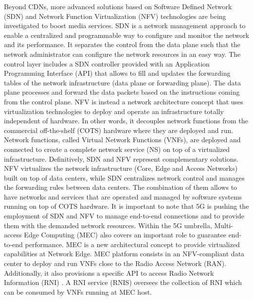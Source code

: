 Beyond CDNs, more advanced solutions based on Software Defined Network (SDN) \cite{kreutz2014software} and Network Function Virtualization (NFV) \cite{Han2015} technologies are being investigated to boost media services.
SDN is a network management approach to enable a centralized and programmable way to configure and monitor the network and its performance. It separates the control from the data plane such that the network administrator can configure the network resources in an easy way. The control layer includes a SDN controller provided with an Application Programming Interface (API) that allows to fill and updates the forwarding tables of the network infrastructure (data plane or forwarding plane). The data plane processes and forward the data packets based on the instructions coming from the control plane. 
NFV is instead a network architecture concept that uses virtualization technologies to deploy and operate an infrastructure totally independent of hardware. In other words, it decouples network functions from the commercial off-the-shelf (COTS) hardware where they are deployed and run. Network functions, called Virtual Network Functions (VNFs), are deployed and connected to create a complete network service (NS) on top of a virtualized infrastructure.
Definitively, SDN and NFV represent complementary solutions. NFV virtualizes the network infrastructure (Core, Edge and Access Networks) built on top of data centers, while SDN centralizes network control and manages the forwarding rules between data centers. The combination of them allows to have networks and services that are operated and managed by software systems running on top of COTS hardware.
It is important to note that 5G is pushing the employment of SDN and NFV to manage end-to-end connections and to provide them with the demanded network resources. Within the 5G umbrella, Multi-access Edge Computing (MEC) \cite{etsi2019} also covers an important role to guarantee end-to-end performance. MEC is a new architectural concept to provide virtualized capabilities at Network Edge. MEC platform consists in an NFV-compliant data center to deploy and run VNFs close to the Radio Access Network (RAN). Additionally, it also provisions a specific API to access Radio Network Information (RNI) \cite{etsigsmec012}. A RNI service (RNIS) oversees the collection of RNI which can be consumed by VNFs running at MEC host.

